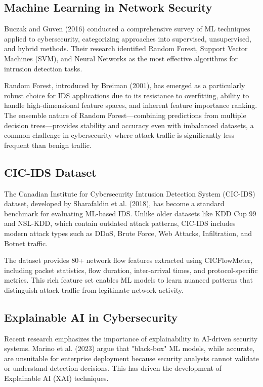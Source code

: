 \documentclass[12pt,a4paper]{article}
\begin{document}
\subsection{Machine Learning in Network Security}

Buczak and Guven (2016) conducted a comprehensive survey of ML techniques applied to cybersecurity, categorizing approaches into supervised, unsupervised, and hybrid methods. Their research identified Random Forest, Support Vector Machines (SVM), and Neural Networks as the most effective algorithms for intrusion detection tasks.

Random Forest, introduced by Breiman (2001), has emerged as a particularly robust choice for IDS applications due to its resistance to overfitting, ability to handle high-dimensional feature spaces, and inherent feature importance ranking. The ensemble nature of Random Forest—combining predictions from multiple decision trees—provides stability and accuracy even with imbalanced datasets, a common challenge in cybersecurity where attack traffic is significantly less frequent than benign traffic.

\subsection{CIC-IDS Dataset}

The Canadian Institute for Cybersecurity Intrusion Detection System (CIC-IDS) dataset, developed by Sharafaldin et al. (2018), has become a standard benchmark for evaluating ML-based IDS. Unlike older datasets like KDD Cup 99 and NSL-KDD, which contain outdated attack patterns, CIC-IDS includes modern attack types such as DDoS, Brute Force, Web Attacks, Infiltration, and Botnet traffic.

The dataset provides 80+ network flow features extracted using CICFlowMeter, including packet statistics, flow duration, inter-arrival times, and protocol-specific metrics. This rich feature set enables ML models to learn nuanced patterns that distinguish attack traffic from legitimate network activity.

\subsection{Explainable AI in Cybersecurity}

Recent research emphasizes the importance of explainability in AI-driven security systems. Marino et al. (2023) argue that "black-box" ML models, while accurate, are unsuitable for enterprise deployment because security analysts cannot validate or understand detection decisions. This has driven the development of Explainable AI (XAI) techniques.
\end{document}
